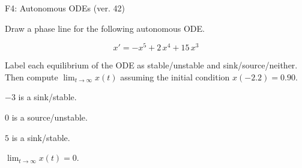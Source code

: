 \begin{exercise}
  \begin{exerciseTitle}F4: Autonomous ODEs (ver. 42)\end{exerciseTitle}
  \begin{exerciseStatement}
    

      Draw a phase line for the following 
      autonomous ODE.
    

    
\[x'= -x^{5} + 2 \, x^{4} + 15 \, x^{3}\]

    

      Label each equilibrium of the ODE
      as stable/unstable and sink/source/neither.
      Then compute \(\lim_{t\to\infty}x(t)\)
      assuming the initial condition
      \(x( -2.2 )= 0.90\).
    

  \end{exerciseStatement}
  \begin{exerciseAnswer}
    

      \(-3\) is a sink/stable.
      
        \(0\) is a source/unstable.
      
      \(5\) is a sink/stable.
    

    

      \(\lim_{t\to\infty}x(t)=0\).
    

  \end{exerciseAnswer}
\end{exercise}